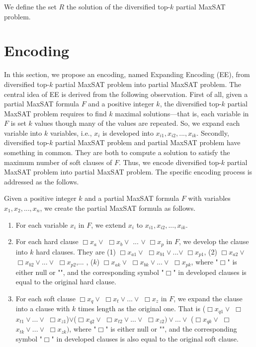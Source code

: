 \documentclass{llncs}
\begin{document}
We define the set $R$ the solution of the diversified top-$k$ partial MaxSAT problem.


\section{Encoding}
In this section, we propose an encoding, named Expanding Encoding (EE), from diversified top-$k$ partial MaxSAT problem into partial MaxSAT problem. The central idea of EE is derived from the following observation. First of all, given a partial MaxSAT formula $F$ and a positive integer $k$, the diversified top-$k$ partial MaxSAT problem requires to find $k$ maximal solutions---that is, each variable in $F$ is set $k$ values though many of the values are repeated. So, we expand each variable into $k$ variables, i.e., $x_i$ is developed into $x_{i1}, x_{i2},..., x_{ik}$. Secondly, diversified top-$k$ partial MaxSAT problem and partial MaxSAT problem have something in common. They are both to compute a solution to satisfy the maximum number of soft clauses of $F$. Thus, we encode diversified top-$k$ partial MaxSAT problem into partial MaxSAT problem. The specific encoding process is addressed as the follows.

Given a positive integer $k$ and a partial MaxSAT formula $F$ with variables $x_1, x_2,..., x_n$, we create the partial MaxSAT formula as follows.
\begin {enumerate}
\item For each variable $x_i$ in $F$, we extend $x_i$ to $x_{i1}, x_{i2},..., x_{ik}$.
\item For each hard clause $\Box$$x_{a}\vee$ $\Box$$x_{b}\vee$ ... $\vee$  $\Box$$x_{p}$ in $F$, we develop the clause into $k$ hard clauses. They are (1) $\Box$$x_{a1} \vee$ $\Box$$x_{b1}\vee$...$\vee$ $\Box$$x_{p1}$, (2) $\Box$$x_{a2} \vee$ $\Box$$x_{b2}\vee...\vee$ $\Box$$x_{p2}$,... , ($k$) $\Box$$x_{ak} \vee$ $\Box$$x_{bk}\vee...\vee$ $\Box$$x_{pk}$, where "$\Box$" is either null or "\textlnot", and the corresponding symbol "$\Box$" in developed clauses is equal to the original hard clause.
\item For each soft clause  $\Box$$x_{q}\vee$ $\Box$$x_{t}\vee...\vee$  $\Box$$x_{z}$ in $F$, we expand the clause into a clause with $k$ times length as the original one. That is ($\Box$$x_{q1}\vee$ $\Box$$x_{t1}\vee...\vee$ $\Box$$x_{z1}$)$\vee$($\Box$$x_{q2}\vee$ $\Box$$x_{t2}\vee...\vee$ $\Box$$x_{z2})\vee ... \vee$ ($\Box$$x_{qk}\vee$ $\Box$$x_{tk}\vee...\vee$ $\Box$$x_{zk})$, where "$\Box$" is either null or "\textlnot", and the corresponding symbol "$\Box$" in developed clauses is also equal to the original soft clause.
\end{enumerate}
\end{document}
